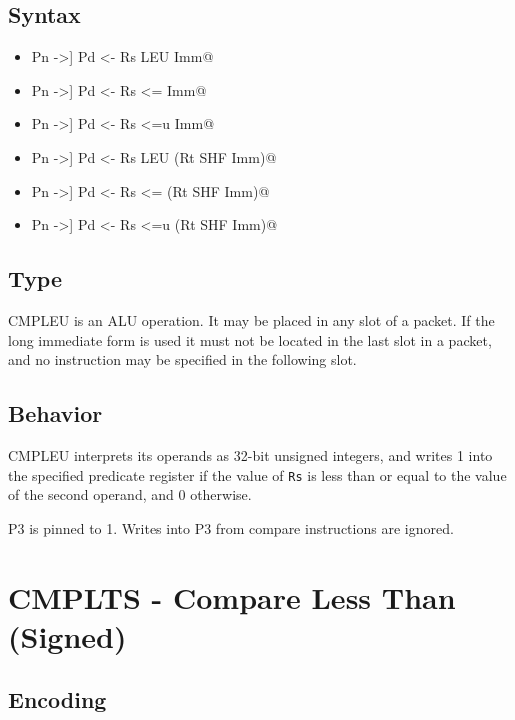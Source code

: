 \documentclass[11pt,openany]{report}
\begin{document}
\subsection{Syntax}

\begin{itemize}
  \item \verb@[[!]Pn ->] Pd <- Rs LEU Imm@
  \item \verb@[[!]Pn ->] Pd <- Rs <= Imm@
  \item \verb@[[!]Pn ->] Pd <- Rs <=u Imm@
  \item \verb@[[!]Pn ->] Pd <- Rs LEU (Rt SHF Imm)@
  \item \verb@[[!]Pn ->] Pd <- Rs <= (Rt SHF Imm)@
  \item \verb@[[!]Pn ->] Pd <- Rs <=u (Rt SHF Imm)@
\end{itemize}

\subsection{Type}
CMPLEU is an ALU operation. It may be placed in any slot of a packet. If the long immediate form is used it must not be located in the last slot in a packet, and no instruction may be specified in the following slot.

\subsection{Behavior}
CMPLEU interprets its operands as 32-bit unsigned integers, and writes 1 into the specified predicate register if the value of \texttt{Rs} is less than or equal to the value of the second operand, and 0 otherwise.

\noindent
P3 is pinned to 1. Writes into P3 from compare instructions are ignored.


\pagebreak
\section{CMPLTS - Compare Less Than (Signed)}
\label{sec:cmpltsinst}

\subsection{Encoding}
\end{document}
